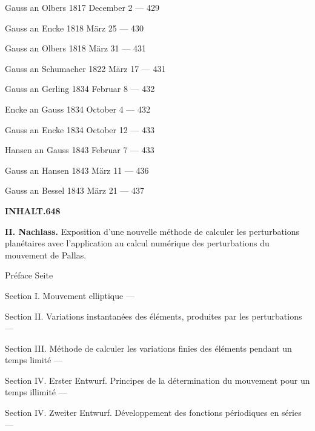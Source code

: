 \documentclass[10pt,a4paper]{article}
\newenvironment{hangparas}[2]{\setlength{\hangindent}{#1}\setlength{\hangafter}{#2}}{}
\begin{document}
\begin{hangparas}{1em}{1}
\noindent Gauss an Olbers 1817 December 2 \hfill --- 429

\noindent Gauss an Encke 1818 März 25 \hfill --- 430

\noindent Gauss an Olbers 1818 März 31 \hfill --- 431

\noindent Gauss an Schumacher 1822 März 17 \hfill --- 431

\noindent Gauss an Gerling 1834 Februar 8 \hfill --- 432

\noindent Encke an Gauss 1834 October 4 \hfill --- 432

\noindent Gauss an Encke 1834 October 12 \hfill --- 433

\noindent Hansen an Gauss 1843 Februar 7 \hfill --- 433

\noindent Gauss an Hansen 1843 März 11 \hfill --- 436

\noindent Gauss an Bessel 1843 März 21 \hfill --- 437
\end{hangparas}

\newpage

\begin{center}
\Large\textbf{INHALT.}\hfill\textbf{648}
\end{center}

\vspace{0.5em}

\begin{hangparas}{1em}{1}
\noindent\textbf{II. Nachlass.} Exposition d'une nouvelle méthode de calculer les perturbations planétaires avec l'application au calcul numérique des perturbations du mouvement de Pallas.

\vspace{0.2em}

\noindent\quad Préface \hfill Seite

\noindent\quad Section I. Mouvement elliptique \hfill ---

\noindent\quad Section II. Variations instantanées des éléments, produites par les perturbations \hfill ---

\noindent\quad Section III. Méthode de calculer les variations finies des éléments pendant un temps limité \hfill ---

\noindent\quad Section IV. Erster Entwurf. Principes de la détermination du mouvement pour un temps illimité \hfill ---

\noindent\quad Section IV. Zweiter Entwurf. Développement des fonctions périodiques en séries \hfill ---
\end{hangparas}
\end{document}
